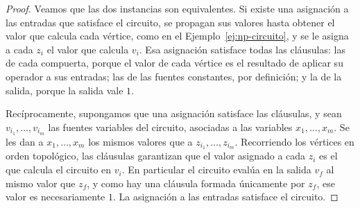 \documentclass[12pt, spanish, oneside, openany]{book}
\theoremstyle{uprightplain}
\theoremstyle{definition}
\theoremstyle{remark}
\theoremstyle{definition}
\begin{document}
\begin{proof}
Veamos que las dos instancias son equivalentes. Si existe una asignación a las entradas que satisface el circuito, se propagan sus valores hasta obtener el valor que calcula cada vértice, como en el Ejemplo~\ref{ej:np-circuito}, y se le asigna a cada $z_i$ el valor que calcula $v_i$. Esa asignación satisface todas las cláusulas: las de cada compuerta, porque el valor de cada vértice es el resultado de aplicar su operador a sus entradas; las de las fuentes constantes, por definición; y la de la salida, porque la salida vale $1$.

Recíprocamente, supongamos que una asignación satisface las cláusulas, y sean $v_{i_1},\dots,v_{i_m}$ las fuentes variables del circuito, asociadas a las variables $x_1,\dots,x_m$. Se les dan a $x_1,\dots,x_m$ los mismos valores que a $z_{i_1},\dots,z_{i_m}$. Recorriendo los vértices en orden topológico, las cláusulas garantizan que el valor asignado a cada $z_i$ es el que calcula el circuito en $v_i$. En particular el circuito evalúa en la salida $v_f$ al mismo valor que $z_f$, y como hay una cláusula formada únicamente por $z_f$, ese valor es necesariamente $1$. La asignación a las entradas satisface el circuito.
\end{proof}
\end{document}
